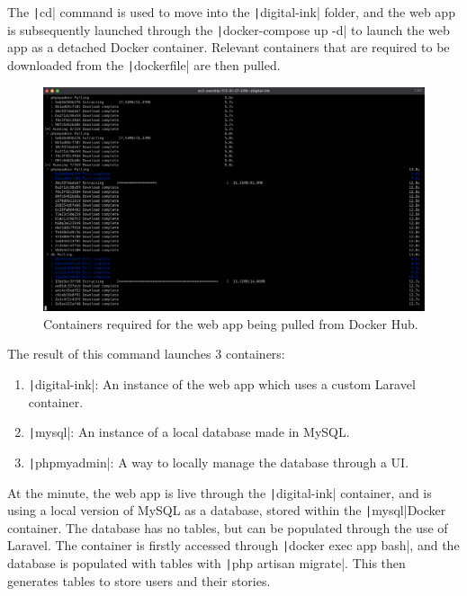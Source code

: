 The \texttt|cd| command is used to move into the \texttt|digital-ink| folder, and the web app is
subsequently launched through the \texttt|docker-compose up -d| to launch the web app as a detached Docker
container.
Relevant containers that are required to be downloaded from the \texttt|dockerfile| are then pulled.

\begin{figure}[!htbp]
    \centering
    \includegraphics[scale=0.3]{resources/ec2/docker-compose}
    \caption{Containers required for the web app being pulled from Docker Hub.}
    \label{fig:webapp-docker-compose}
\end{figure}

The result of this command launches 3 containers:

\begin{enumerate}
    \item \texttt|digital-ink|: An instance of the web app which uses a custom Laravel container.
    \item \texttt|mysql|: An instance of a local database made in MySQL\@.
    \item \texttt|phpmyadmin|: A way to locally manage the database through a UI\@.
\end{enumerate}

At the minute, the web app is live through the \texttt|digital-ink| container, and is using a local version
of MySQL as a database, stored within the \texttt|mysql|Docker container.
The database has no tables, but can be populated through the use of Laravel.
The container is firstly accessed through \texttt|docker exec app bash|, and the database is populated with
tables with \texttt|php artisan migrate|.
This then generates tables to store users and their stories.

